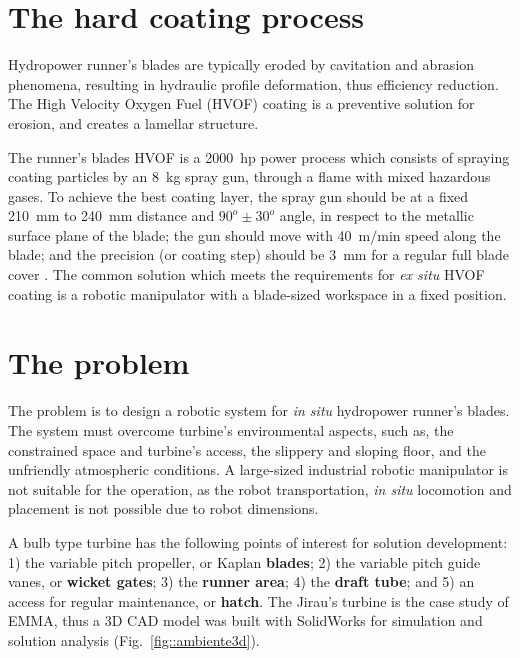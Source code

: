 \section{The hard coating process}

Hydropower runner's blades are typically eroded by cavitation and abrasion
phenomena, resulting in hydraulic profile deformation, thus efficiency
reduction. The High Velocity Oxygen Fuel (HVOF) coating is a preventive
solution for erosion, and creates a lamellar structure. 

The runner's blades HVOF is a 2000~hp power process which consists of
spraying coating particles by an 8~kg spray gun, through a flame with mixed
hazardous gases. To achieve the best coating layer, the spray gun should be at
a fixed 210~mm to 240~mm distance and $90^o \pm 30^o$ angle, in respect to the
metallic surface plane of the blade; the gun should move with 40~m/min speed
along the blade; and the precision (or coating step) should be 3~mm for a
regular full blade cover \cite{li2002effect}. The
common solution which meets the requirements for \textit{ex situ} HVOF coating
is a robotic manipulator with a blade-sized workspace in a fixed position.

\section{The problem}\label{problem}

The problem is to design a robotic system for \textit{in situ}
hydropower runner's blades. The system must overcome turbine's environmental
aspects, such as, the constrained space and turbine's access, the slippery and sloping
floor, and the unfriendly atmospheric conditions. A large-sized industrial
robotic manipulator is not suitable for the operation, as the robot
transportation, \textit{in situ} locomotion and placement is not possible due
to robot dimensions.

A bulb type turbine has the following points of interest for solution
development: 1) the variable pitch propeller, or Kaplan \textbf{blades}; 2) the
variable pitch guide vanes, or \textbf{wicket gates}; 3) the \textbf{runner
area}; 4) the \textbf{draft tube}; and 5) an access for regular
maintenance, or \textbf{hatch}. The Jirau's turbine is the case study of EMMA,
thus a 3D CAD model was built with SolidWorks\raisebox{1ex}{\textregistered}
for simulation and solution analysis (Fig.~\ref{fig::ambiente3d}).

